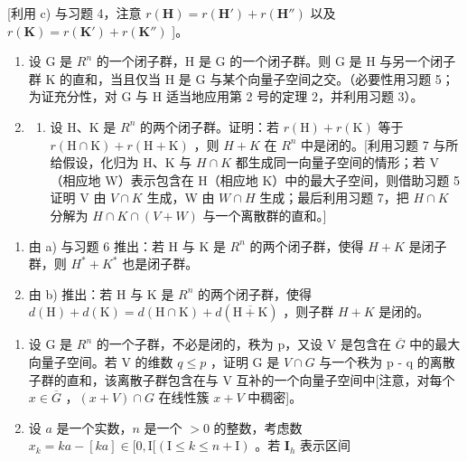 {[}利用 c) 与习题 4，注意 \(r(\mathbf{H}) = r(\mathbf{H}') + r(\mathbf{H}'')\) 以及 \(r(\mathbf{K}) = r(\mathbf{K}') + r(\mathbf{K}'' )\) {]}。

\begin{enumerate}
\def\labelenumi{\arabic{enumi})}
\setcounter{enumi}{6}
\item
  设 G 是 \(R^{n}\) 的一个闭子群，H 是 G 的一个闭子群。则 G 是 H 与另一个闭子群 K 的直和，当且仅当 H 是 G 与某个向量子空间之交。（必要性用习题 5；为证充分性，对 G 与 H 适当地应用第 2 号的定理 2，并利用习题 3）。
\item
  \begin{enumerate}
  \def\labelenumii{\alph{enumii})}
  \tightlist
  \item
    设 H、K 是 \(R^{n}\) 的两个闭子群。证明：若 \(r(\mathrm{H}) + r(\mathrm{K})\) 等于 \(r(\mathrm{H} \cap \mathrm{K}) + r(\mathrm{H} + \mathrm{K})\) ，则 \(H + K\) 在 \(R^{n}\) 中是闭的。{[}利用习题 7 与所给假设，化归为 H、K 与 \(H \cap K\) 都生成同一向量子空间的情形；若 V（相应地 W）表示包含在 H（相应地 K）中的最大子空间，则借助习题 5 证明 V 由 \(V \cap K\) 生成，W 由 \(W \cap H\) 生成；最后利用习题 7，把 \(H \cap K\) 分解为 \(H \cap K \cap (V + W)\) 与一个离散群的直和。{]}
  \end{enumerate}
\end{enumerate}

\begin{enumerate}
\def\labelenumi{\alph{enumi})}
\setcounter{enumi}{1}
\item
  由 a) 与习题 6 推出：若 H 与 K 是 \(R^{n}\) 的两个闭子群，使得 \(H + K\) 是闭子群，则 \(H^{*} + K^{*}\) 也是闭子群。
\item
  由 b) 推出：若 H 与 K 是 \(R^{n}\) 的两个闭子群，使得 \(d(\mathrm{H}) + d(\mathrm{K}) = d(\mathrm{H} \cap \mathrm{K}) + d(\overline{\mathrm{H} + \mathrm{K}})\) ，则子群 \(H + K\) 是闭的。
\end{enumerate}

\begin{enumerate}
\def\labelenumi{\arabic{enumi})}
\setcounter{enumi}{8}
\item
  设 G 是 \(R^{n}\) 的一个子群，不必是闭的，秩为 p，又设 V 是包含在 \(\overline{G}\) 中的最大向量子空间。若 V 的维数 \(q \leqslant p\) ，证明 G 是 \(V \cap G\) 与一个秩为 p - q 的离散子群的直和，该离散子群包含在与 V 互补的一个向量子空间中{[}注意，对每个 \(x \in \overline{G}\) ，\((x + V) \cap G\) 在线性簇 \(x + V\) 中稠密{]}。
\item
  设 \(a\) 是一个实数，\(n\) 是一个 \(>0\) 的整数，考虑数 \(x_{k} = ka - [ka] \in [0, \mathrm{I}[(\mathrm{I} \leqslant k \leqslant n + \mathrm{I})\) 。若 \(\mathbf{I}_h\) 表示区间
\end{enumerate}

